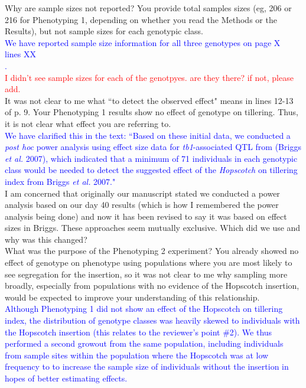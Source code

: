 \documentclass[11pt]{article}
\newcommand{\res}[1]{\noindent \textcolor{blue}{{#1}} \\}
\newcommand{\jri}[1]{\noindent \textcolor{red}{{#1}} \\}
\newcommand{\mbh}[1]{\noindent \textcolor{Dandelion}{{#1}}\\}
\begin{document}
Why are sample sizes not reported?  You provide total samples sizes (eg, 206 or 216 for Phenotyping 1, depending on whether you read the Methods or the Results), but not sample sizes for each genotypic class.\\

\res{We have reported sample size information for all three genotypes on page \mbh{X} lines \mbh{XX}.} \jri{I didn't see sample sizes for each of the genotpyes. are they there? if not, please add.}

It was not clear to me what ``to detect the observed effect" means in lines 12-13 of p. 9.  Your Phenotyping 1 results show no effect of genotype on tillering.  Thus, it is not clear what effect you are referring to.\\

\res{We have clarified this in the text: ``Based on these initial data, we conducted a \emph{post hoc} power analysis using effect size data for \emph{tb1}-associated QTL from (Briggs \emph{et al.} 2007), which indicated that a minimum of 71 individuals in each genotypic class would be needed to detect the suggested effect of the \emph{Hopscotch} on tillering index from Briggs \emph{et al.} 2007."}
\mbh{I am concerned that originally our manuscript stated we conducted a power analysis based on our day 40 results (which is how I remembered the power analysis being done) and now it has been revised to say it was based on effect sizes in Briggs.  These approaches seem mutually exclusive.  Which did we use and why was this changed?}

What was the purpose of the Phenotyping 2  experiment?  You already showed no effect of genotype on phenotype using populations where you are most likely to see segregation for the insertion, so it was not clear to me why sampling more broadly, especially from populations with no evidence of the Hopscotch insertion, would be expected to improve your understanding of this relationship.\\

\res{Although Phenotyping 1 did not show an effect of the Hopscotch on tillering index, the distribution of genotype classes was  heavily skewed to individuals with the Hopscotch insertion (this relates to the reviewer's point \#2).  We thus performed a second growout from the same population, including individuals from sample sites within the population where the Hopscotch was at low frequency to to increase the sample size of individuals without the insertion in hopes of better estimating effects.}
\end{document}
